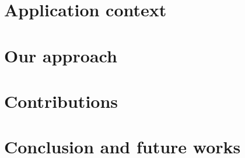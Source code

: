     \section[Context]{Application context}
    
    
    
    
    \section{Our approach}
    
    
    \section{Contributions}
    
    
    
    
    
    
    \section[Conclusion]{Conclusion and future works}
    
    
    
    
    \miniframesoff
    
    
